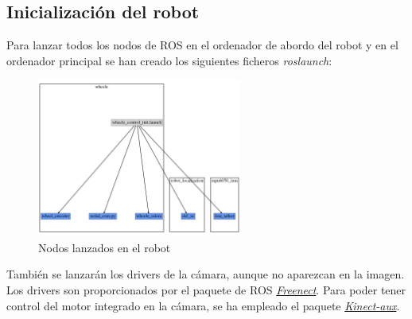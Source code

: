 \newpage
\subsection{Inicialización del robot}
Para lanzar todos los nodos de ROS en el ordenador de abordo del robot y en el ordenador principal se han creado los siguientes ficheros \textit{roslaunch}:
    \begin{figure}[!ht]
        \centering
        \includegraphics[width=0.6\textwidth]{images/whee}
        \caption{Nodos lanzados en el robot}
    \end{figure}

También se lanzarán los drivers de la cámara, aunque no aparezcan en la imagen. Los drivers son proporcionados por el 
paquete de ROS \textit{\href{https://github.com/ros-drivers/freenect\_stack}{Freenect}}.
Para poder tener control del motor integrado en la cámara, se ha empleado el paquete \textit{\href{https://github.com/muhrix/kinect_aux}{Kinect-aux}}.
    